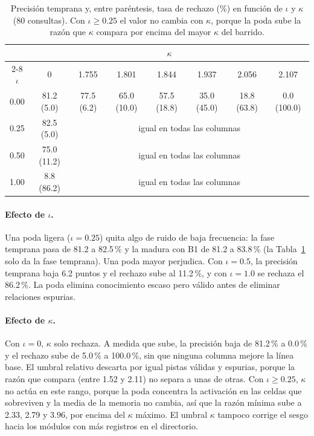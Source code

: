 \begin{table}[H]
    \centering
    \caption[Precisión temprana y tasa de rechazo en función de $\iota$ y $\kappa$]{Precisión temprana y, entre paréntesis, tasa de rechazo (\%) en función de
    $\iota$ y $\kappa$ (80 consultas). Con $\iota \geq 0.25$ el valor no cambia con
    $\kappa$, porque la poda sube la razón que $\kappa$ compara por encima del mayor
    $\kappa$ del barrido.}
    \label{tab:grid-iota-kappa}
    \small
    \begin{tabular}{cccccccc}
        \toprule
        & \multicolumn{7}{c}{$\kappa$} \\
        \cmidrule(lr){2-8}
        $\iota$ & 0 & 1.755 & 1.801 & 1.844 & 1.937 & 2.056 & 2.107 \\
        \midrule
        0.00 & 81.2 (5.0) & 77.5 (6.2) & 65.0 (10.0) & 57.5 (18.8) & 35.0 (45.0) & 18.8 (63.8) & 0.0 (100.0) \\
        0.25 & 82.5 (5.0)  & \multicolumn{6}{c}{igual en todas las columnas} \\
        0.50 & 75.0 (11.2) & \multicolumn{6}{c}{igual en todas las columnas} \\
        1.00 &  8.8 (86.2) & \multicolumn{6}{c}{igual en todas las columnas} \\
        \bottomrule
    \end{tabular}
\end{table}

\paragraph{Efecto de $\iota$.}
Una poda ligera ($\iota = 0.25$) quita algo de ruido de baja frecuencia: la fase
temprana pasa de 81.2 a 82.5\,\% y la madura con B1 de 81.2 a 83.8\,\% (la
Tabla~\ref{tab:grid-iota-kappa} solo da la fase temprana).
Una poda mayor perjudica.
Con $\iota = 0.5$, la precisión temprana baja 6.2 puntos y el rechazo sube al 11.2\,\%, y
con $\iota = 1.0$ se rechaza el 86.2\,\%.
La poda elimina conocimiento escaso pero válido antes de eliminar relaciones espurias.

\paragraph{Efecto de $\kappa$.}
Con $\iota = 0$, $\kappa$ solo rechaza.
A medida que sube, la precisión baja de 81.2\,\% a 0.0\,\% y el rechazo sube de 5.0\,\% a
100.0\,\%, sin que ninguna columna mejore la línea base.
El umbral relativo descarta por igual pistas válidas y espurias, porque la razón que
compara (entre 1.52 y 2.11) no separa a unas de otras.
Con $\iota \geq 0.25$, $\kappa$ no actúa en este rango, porque la poda concentra la
activación en las celdas que sobreviven y la media de la memoria no cambia, así que la
razón mínima sube a 2.33, 2.79 y 3.96, por encima del $\kappa$ máximo.
El umbral $\kappa$ tampoco corrige el sesgo hacia los módulos con más registros en el
directorio.

